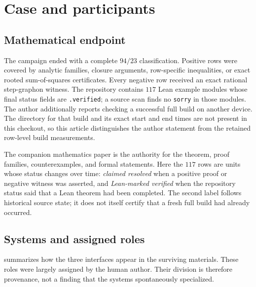 \documentclass[11pt]{article}
\begin{document}
\section{Case and participants}
\label{sec:case}

\subsection{Mathematical endpoint}

The campaign ended with a complete $94/23$ classification.  Positive rows
were covered by analytic families, closure arguments, row-specific
inequalities, or exact rooted sum-of-squares certificates.  Every negative
row received an exact rational step-graphon witness.  The repository contains
$117$ Lean example modules whose final status fields are
\texttt{.verified}; a source scan finds no \texttt{sorry} in those modules.
The author additionally reports checking a successful full build on another
device.  The directory for that build and its exact start and end times are
not present in this checkout, so this article distinguishes the author
statement from the retained row-level build measurements.

The companion mathematics paper is the authority for the theorem, proof
families, counterexamples, and formal statements.  Here the $117$ rows are
units whose status changes over time: \emph{claimed resolved} when a positive
proof or negative witness was asserted, and \emph{Lean-marked verified} when
the repository status said that a Lean theorem had been completed.  The
second label follows historical source state; it does not itself certify that
a fresh full build had already occurred.

\subsection{Systems and assigned roles}

 summarizes how the three interfaces appear in the surviving
materials.  These roles were largely assigned by the human author.  Their
division is therefore provenance, not a finding that the systems
spontaneously specialized.
\end{document}
